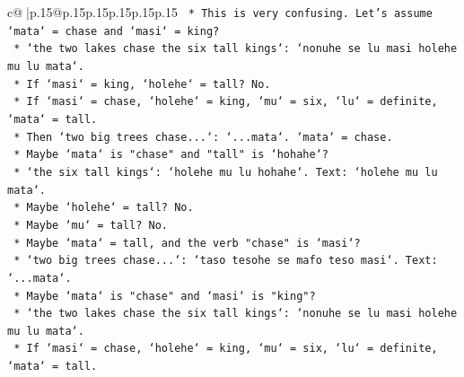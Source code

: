 \documentclass{article}
\begin{document}
{\begin{supertabular}{c@{$\;$}|p{.15\linewidth}@{}p{.15\linewidth}p{.15\linewidth}p{.15\linewidth}p{.15\linewidth}p{.15\linewidth}}
{{{\texttt{                                                                    *   This is very confusing. Let's assume `mata` = chase and `masi` = king?} \\
\texttt{                                                                        *   `the two lakes chase the six tall kings`: `nonuhe se lu masi holehe mu lu mata`.} \\
\texttt{                                                                        *   If `masi` = king, `holehe` = tall? No.} \\
\texttt{                                                                        *   If `masi` = chase, `holehe` = king, `mu` = six, `lu` = definite, `mata` = tall.} \\
\texttt{                                                                        *   Then `two big trees chase...`: `...mata`. `mata` = chase.} \\
\texttt{                                                                        *   Maybe `mata` is "chase" and "tall" is `hohahe`?} \\
\texttt{                                                                            *   `the six tall kings`: `holehe mu lu hohahe`. Text: `holehe mu lu mata`.} \\
\texttt{                                                                            *   Maybe `holehe` = tall? No.} \\
\texttt{                                                                            *   Maybe `mu` = tall? No.} \\
\texttt{                                                                            *   Maybe `mata` = tall, and the verb "chase" is `masi`?} \\
\texttt{                                                                                *   `two big trees chase...`: `taso tesohe se mafo teso masi`. Text: `...mata`.} \\
\texttt{                                                                                *   Maybe `mata` is "chase" and `masi` is "king"?} \\
\texttt{                                                                                    *   `the two lakes chase the six tall kings`: `nonuhe se lu masi holehe mu lu mata`.} \\
\texttt{                                                                                    *   If `masi` = chase, `holehe` = king, `mu` = six, `lu` = definite, `mata` = tall.} \\
}}}
\end{supertabular}}
\end{document}
